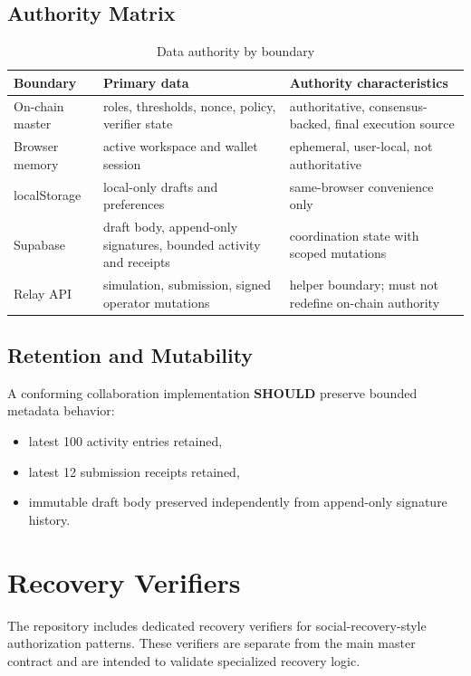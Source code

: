 \documentclass[11pt]{article}
\newcommand{\should}{\textbf{SHOULD}}
\begin{document}
\subsection{Authority Matrix}
\begin{table}[h!]
  \centering
  \caption{Data authority by boundary}
  \begin{tabularx}{\textwidth}{>{\raggedright\arraybackslash}p{}>{\raggedright\arraybackslash}p{}X}
    \toprule
    Boundary & Primary data & Authority characteristics \\
    \midrule
    On-chain master & roles, thresholds, nonce, policy, verifier state & authoritative, consensus-backed, final execution source \\
    Browser memory & active workspace and wallet session & ephemeral, user-local, not authoritative \\
    localStorage & local-only drafts and preferences & same-browser convenience only \\
    Supabase & draft body, append-only signatures, bounded activity and receipts & coordination state with scoped mutations \\
    Relay API & simulation, submission, signed operator mutations & helper boundary; must not redefine on-chain authority \\
    \bottomrule
  \end{tabularx}
\end{table}

\subsection{Retention and Mutability}
A conforming collaboration implementation \should{} preserve bounded metadata behavior:
\begin{itemize}
  \item latest 100 activity entries retained,
  \item latest 12 submission receipts retained,
  \item immutable draft body preserved independently from append-only signature history.
\end{itemize}

\section{Recovery Verifiers}
The repository includes dedicated recovery verifiers for social-recovery-style authorization patterns. These verifiers are separate from the main master contract and are intended to validate specialized recovery logic.
\end{document}
